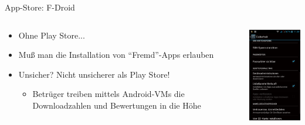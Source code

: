 \documentclass{beamer}
\begin{document}
\begin{frame}{App-Store: F-Droid}

\begin{columns}[c]
  \begin{column}[T]{.7\textwidth}
    \begin{itemize}
      \item  Ohne Play Store... 
      \item Muß man die Installation von "`Fremd"'-Apps erlauben

        \pause

      \item Unsicher? \pause Nicht unsicherer als Play Store!
        \begin{itemize}
          \item Betrüger treiben mittels Android-VMs die Downloadzahlen und Bewertungen in die Höhe
        \end{itemize}
    \end{itemize}
  \end{column}
  \begin{column}[T]{.3\textwidth}
    \includegraphics[width=3.5cm]{fremdapps.png} 
   \end{column}
\end{columns}

\pause

\begin{columns}[c]
  \begin{column}[T]{.7\textwidth}


\end{column}
\end{columns}
\end{frame}
\end{document}
